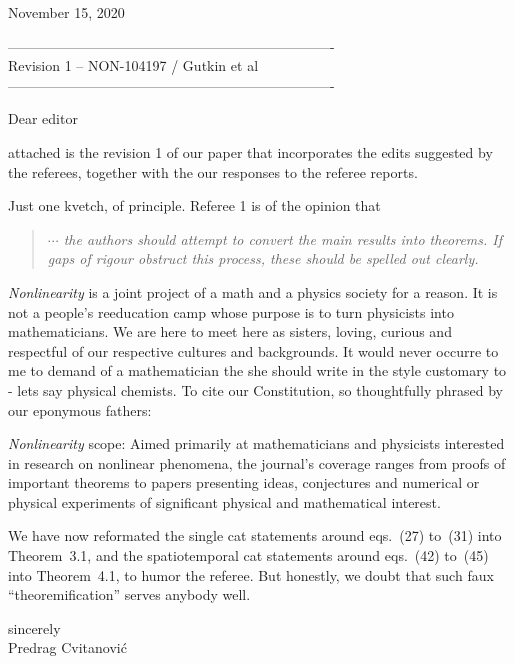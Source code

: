 \documentclass[12pt]{iopart}
\begin{document}
\bigskip
                    \hfill November 15, 2020


\bigskip
\noindent
---------------------------------------------------------------------- \\
Revision 1 -- NON-104197 / Gutkin et al \\
---------------------------------------------------------------------- \\
\bigskip
\bigskip

\noindent
Dear editor

attached is the revision 1 of our paper that incorporates the edits suggested
by the referees, together with the our responses to the referee reports.

Just one kvetch, of principle. Referee 1 is of the opinion that

\begin{quote}
{\em $\cdots$ the authors should attempt to convert the main results into
theorems. If gaps of rigour obstruct this process, these should be
spelled out clearly.}
\end{quote}


\emph{Nonlinearity} is a joint project of a math and a physics society
for a reason. It is not a people's reeducation camp whose purpose is to
turn physicists into mathematicians. We are here to meet here as sisters,
loving, curious and respectful of our respective cultures and
backgrounds. It would never occurre to me to demand of a mathematician
the she should write in the style customary to - lets say physical
chemists.
To cite our Constitution, so thoughtfully phrased by our eponymous fathers:

\emph{Nonlinearity} scope: Aimed primarily at mathematicians and physicists
interested in research on nonlinear phenomena, the journal's coverage
ranges from proofs of important theorems to papers presenting ideas,
conjectures and numerical or physical experiments of significant physical
and mathematical interest.

We have now reformated the single cat statements around eqs.~(27) to~(31)
into Theorem~3.1, and the spatiotemporal cat statements around eqs.~(42)
to~(45) into Theorem~4.1, to humor the  referee.
But honestly, we doubt that such faux ``theoremification'' serves anybody
well.
\bigskip\bigskip

\noindent
sincerely
\\
Predrag Cvitanovi\'c
\end{document}
